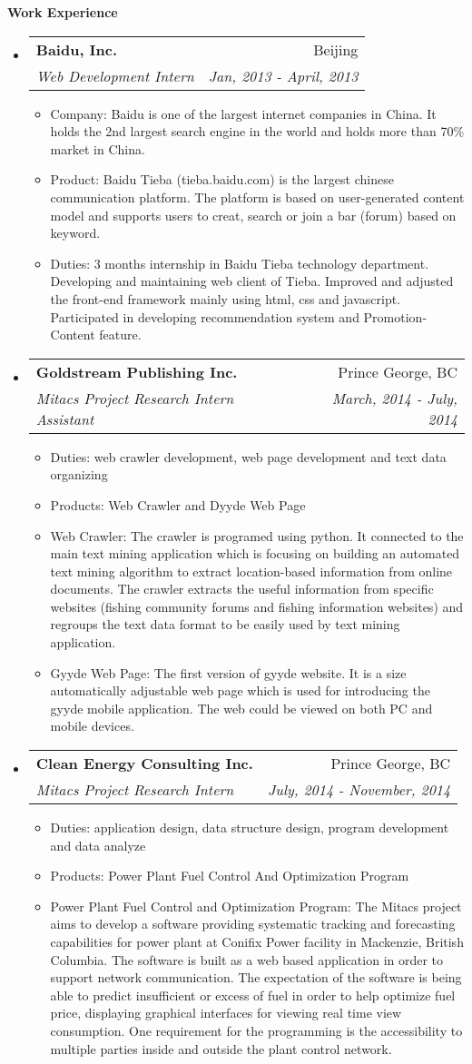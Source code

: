 \documentclass[letterpaper,11pt]{article}
\makeatletter
\newcommand{\resitem}[1]{\item #1 \vspace{-2pt}}
\newcommand{\resheading}[1]{{\large \colorbox{mygrey}{\begin{minipage}{\textwidth}{\textbf{#1 \vphantom{p\^{E}}}}\end{minipage}}}}
\newcommand{\ressubheading}[4]{
\begin{tabular*}{7.0in}{l@{\extracolsep{\fill}}r}
		\textbf{#1} & #2 \\
		\textit{#3} & \textit{#4} \\
\end{tabular*}\vspace{-6pt}}
\makeatother
\begin{document}
\resheading{Work Experience}
\begin{itemize}
\item
	\ressubheading{Baidu, Inc.}{Beijing}{Web Development Intern}{Jan, 2013 - April, 2013}
	\begin{itemize}
		\resitem{Company: Baidu is one of the largest internet companies in China. It holds the 2nd largest search engine in the world and holds more than 70\% market in China.}
		\resitem{Product: Baidu Tieba (tieba.baidu.com) is the largest chinese communication platform. The platform is based on user-generated content model and supports users to creat, search or join a bar (forum) based on keyword.}
		\resitem{Duties: 3 months internship in Baidu Tieba technology department. Developing and maintaining web client of Tieba. Improved and adjusted the front-end framework mainly using html, css and javascript. Participated in developing recommendation system and Promotion-Content feature.}
	\end{itemize}
\item
	\ressubheading{Goldstream Publishing Inc.}{Prince George, BC}{Mitacs Project Research Intern Assistant}{March, 2014 - July, 2014}
	\begin{itemize}
		\resitem{Duties: web crawler development, web page development and text data organizing}
		\resitem{Products: Web Crawler and Dyyde Web Page}
		\resitem{Web Crawler: The crawler is programed using python. It connected to the main text mining application which is focusing on building an automated text mining algorithm to extract location-based information from online documents. The crawler extracts the useful information from specific websites (fishing community forums and fishing information websites) and regroups the text data format to be easily used by text mining application.}
		\resitem{Gyyde Web Page: The first version of gyyde website. It is a size automatically adjustable web page which is used for introducing the gyyde mobile application. The web could be viewed on both PC and mobile devices.}
	\end{itemize}
\item
	\ressubheading{Clean Energy Consulting Inc.}{Prince George, BC}{Mitacs Project Research Intern}{July, 2014 - November, 2014}
	\begin{itemize}
		\resitem{Duties: application design, data structure design, program development and data analyze}
		\resitem{Products: Power Plant Fuel Control And Optimization Program}
		\resitem{Power Plant Fuel Control and Optimization Program: The Mitacs project aims to develop a software providing systematic tracking and forecasting capabilities for power plant at Conifix Power facility in Mackenzie, British Columbia. The software is built as a web based application in order to support network communication. The expectation of the software is being able to predict insufficient or excess of fuel in order to help optimize fuel price, displaying graphical interfaces for viewing real time view consumption. One requirement for the programming is the accessibility to multiple parties inside and outside the plant control network.}

\end{itemize}
\end{itemize}
\end{document}

